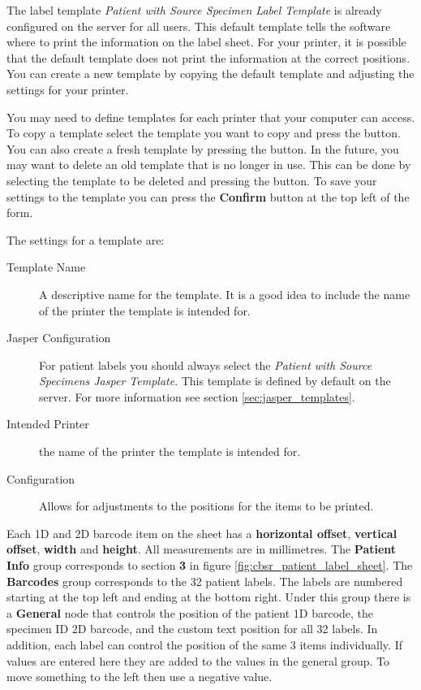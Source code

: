 The label template \emph{Patient with Source Specimen Label Template} is
already configured on the server for all users. This default template
tells the software where to print the information on the label sheet.  For your
printer, it is possible that the default template does not print the information
at the correct positions. You can create a new template by copying the default
template and adjusting the settings for your printer.

You may need to define templates for each printer that your computer can
access. To copy a template select the template you want to copy and press the
 button. You can also create a fresh template by pressing the
 button. In the future, you may want to delete an old template that
is no longer in use. This can be done by selecting the template to be deleted
and pressing the  button. To save your settings to the template
you can press the \textbf{Confirm} button at the top left of the form.

The settings for a template are:
\begin{description}
\item[Template Name] A descriptive name for the template. It is a good idea to
  include the name of the printer the template is intended for.
\item[Jasper Configuration] For patient labels you should always select the
\emph{Patient with Source Specimens Jasper Template}. This template is defined
by default on the server. For more information see section \ref{sec:jasper_templates}.
\item[Intended Printer] the name of the printer the template is intended for.
\item[Configuration] Allows for adjustments to the positions for the items to be printed.
\end{description}

Each 1D and 2D barcode item on the sheet has a \textbf{horizontal offset},
\textbf{vertical offset}, \textbf{width} and \textbf{height}. All measurements
are in millimetres. The \textbf{Patient Info} group corresponds to section
\textbf{3} in figure \ref{fig:cbsr_patient_label_sheet}. The \textbf{Barcodes}
group corresponds to the 32 patient labels. The labels are numbered starting at
the top left and ending at the bottom right. Under this group there is a
\textbf{General} node that controls the position of the patient 1D barcode, the
specimen ID 2D barcode, and the custom text position for all 32 labels. In
addition, each label can control the position of the same 3 items
individually. If values are entered here they are added to the values in the
general group. To move something to the left then use a negative value.

